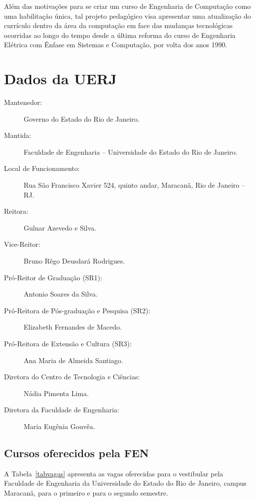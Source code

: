 Além das motivações para se criar um curso de Engenharia de Computação como uma habilitação única, tal projeto pedagógico visa apresentar uma atualização do currículo dentro da área da computação em face das mudanças tecnológicas ocorridas ao longo do tempo desde a última reforma do curso de Engenharia Elétrica com Ênfase em Sistemas e Computação, por volta dos anos 1990.


\chapter{Dados da UERJ}

\begin{description}
	\item[Mantenedor:] Governo do Estado do Rio de Janeiro.
	\item [Mantida:] Faculdade de Engenharia -- Universidade do Estado do Rio de Janeiro.
	\item [Local de Funcionamento:] Rua São Francisco Xavier 524, quinto andar, Maracanã, Rio de Janeiro -- RJ.
	\item [Reitora:] Gulnar Azevedo e Silva.
	\item [Vice-Reitor:] Bruno Rêgo Deusdará Rodrigues.
	\item [Pró-Reitor de Graduação (SR1):] Antonio Soares da Silva.
	\item [Pró-Reitora de Pós-graduação e Pesquisa (SR2):] Elizabeth Fernandes de Macedo.
	\item [Pró-Reitora de Extensão e Cultura (SR3):] Ana Maria de Almeida Santiago.
	\item [Diretora do Centro de Tecnologia e Ciências:] Nádia Pimenta Lima.
	\item [Diretora da Faculdade de Engenharia:]  Maria Eugênia Gouvêa.
\end{description}
 

\section{Cursos oferecidos pela FEN}
A Tabela~\ref{tabvagas} apresenta as vagas oferecidas para o vestibular pela Faculdade de Engenharia da Universidade do Estado do Rio de Janeiro, campus Maracanã, para o primeiro e para o segundo semestre.
\label{sec:cursosoferecidos}

